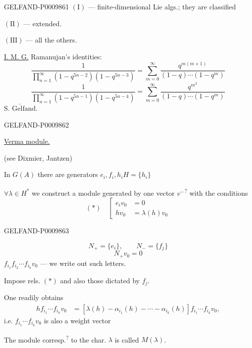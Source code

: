 \begin{GelfandAdjacentEvidence}{GELFAND-P000986}{1}
$(\mathrm I)$ --- finite-dimensional Lie algs.; they are classified

$(\mathrm{II})$ --- extended.

$(\mathrm{III})$ --- all the others.

\underline{I. M. G.} Ramanujan's identities:
\[
\frac{1}{\displaystyle\prod_{n=1}^{\infty}(1-q^{5n-2})(1-q^{5n-3})}
=\sum_{m=0}^{\infty}\frac{q^{m(m+1)}}{(1-q)\cdots(1-q^m)}
\]
\[
\frac{1}{\displaystyle\prod_{n=1}^{\infty}(1-q^{5n-1})(1-q^{5n-4})}
=\sum_{m=0}^{\infty}\frac{q^{m^2}}{(1-q)\cdots(1-q^m)}
\]
$\underrightarrow{\text{S. Gelfand.}}$

\end{GelfandAdjacentEvidence}
\begin{GelfandAdjacentEvidence}{GELFAND-P000986}{2}


\underline{Verma module.}

(see Dixmier, Jantzen)

In $G(A)$ there are generators $e_i,f_i,h_i$\qquad $H=\{h_i\}$

$\forall\lambda\in H^*$ we construct a module generated by one vector $v^{-}$\textsuperscript{?} with the conditions
\[
(*)\quad\left[
\begin{aligned}
e_i v_0&=0\\
h v_0&=\lambda(h)v_0
\end{aligned}
\right.
\]
\end{GelfandAdjacentEvidence}
\begin{GelfandAdjacentEvidence}{GELFAND-P000986}{3}

\[
N_+=\{e_i\},\qquad N_-=\{f_j\}
\]
\[
N_+v_0=0
\]
$f_{i_1}f_{i_2}\cdots f_{i_k}v_0$ --- we write out such letters.

Impose rels. $(*)$ and also those dictated by $f_j$.

One readily obtains
\[
\begin{aligned}
h f_{i_1}\cdots f_{i_k}v_0
&=[\lambda(h)-\alpha_{i_1}(h)-\cdots-\alpha_{i_k}(h)]
f_{i_1}\cdots f_{i_k}v_0,
\end{aligned}
\]
i.e. $f_{i_1}\cdots f_{i_k}v_0$ is also a weight vector

The module corresp.\textsuperscript{?} to the char. $\lambda$ is called $M(\lambda)$.
\end{GelfandAdjacentEvidence}
